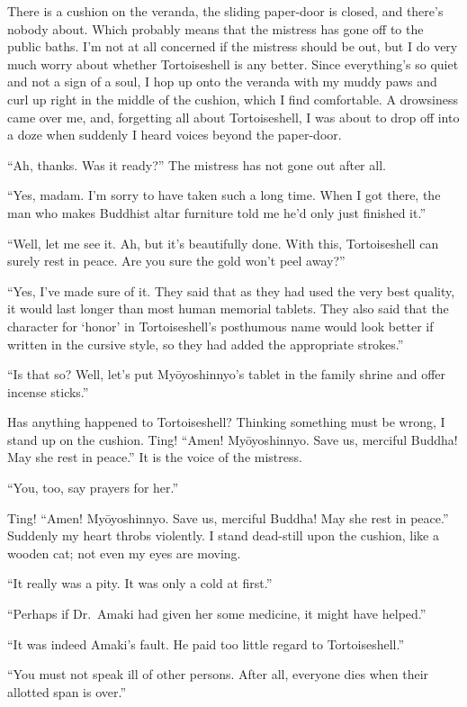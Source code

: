 \documentclass[12pt, openright]{book}
\begin{document}
There is a cushion on the veranda, the sliding paper-door is closed, and
there's nobody about. Which probably means that the mistress has gone
off to the public baths. I'm not at all concerned if the mistress should
be out, but I do very much worry about whether Tortoiseshell is any
better. Since everything's so quiet and not a sign of a soul, I hop up
onto the veranda with my muddy paws and curl up right in the middle of
the cushion, which I find comfortable. A drowsiness came over me, and,
forgetting all about Tortoiseshell, I was about to drop off into a doze
when suddenly I heard voices beyond the paper-door.

``Ah, thanks. Was it ready?'' The mistress has not gone out after all.

``Yes, madam. I'm sorry to have taken such a long time. When I got
there, the man who makes Buddhist altar furniture told me he'd only just
finished it.''

``Well, let me see it. Ah, but it's beautifully done. With this,
Tortoiseshell can surely rest in peace. Are you sure the gold won't peel
away?''

``Yes, I've made sure of it. They said that as they had used the very
best quality, it would last longer than most human memorial tablets.
They also said that the character for `honor' in Tortoiseshell's
posthumous name would look better if written in the cursive style, so
they had added the appropriate strokes.''

``Is that so? Well, let's put Myōyoshinnyo's tablet in the family shrine
and offer incense sticks.''

Has anything happened to Tortoiseshell? Thinking something must be
wrong, I stand up on the cushion. Ting! ``Amen! Myōyoshinnyo. Save us,
merciful Buddha! May she rest in peace.'' It is the voice of the
mistress.

``You, too, say prayers for her.''

Ting! ``Amen! Myōyoshinnyo. Save us, merciful Buddha! May she rest in
peace.'' Suddenly my heart throbs violently. I stand dead-still upon the
cushion, like a wooden cat; not even my eyes are moving.

``It really was a pity. It was only a cold at first.''

``Perhaps if Dr.~Amaki had given her some medicine, it might have
helped.''

``It was indeed Amaki's fault. He paid too little regard to
Tortoiseshell.''

``You must not speak ill of other persons. After all, everyone dies when
their allotted span is over.''
\end{document}
